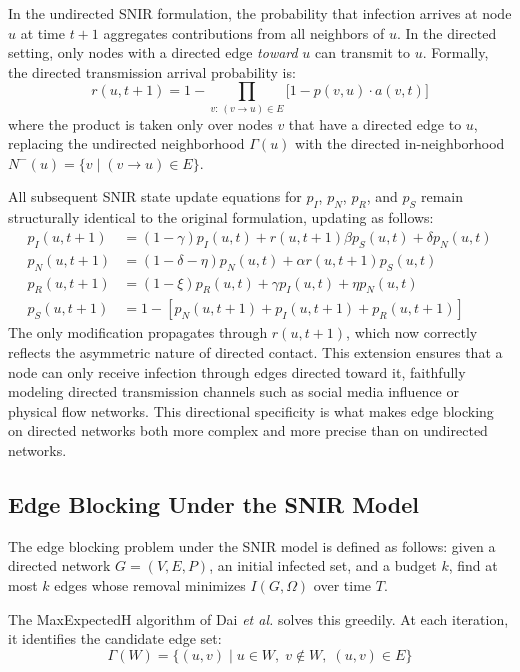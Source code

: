 \documentclass[conference]{IEEEtran}
\begin{document}
In the undirected SNIR formulation, the probability that infection arrives at node $u$ at time $t{+}1$ aggregates contributions from all neighbors of $u$. In the directed setting, only nodes with a directed edge \emph{toward} $u$ can transmit to $u$. Formally, the directed transmission arrival probability is:
\begin{equation}
r(u,t{+}1) = 1 - \prod_{v:\,(v \to u) \in E} \bigl[1 - p(v,u) \cdot a(v,t)\bigr]
\end{equation}
where the product is taken only over nodes $v$ that have a directed edge to $u$, replacing the undirected neighborhood $\Gamma(u)$ with the directed in-neighborhood $N^{-}(u) = \{v \mid (v \to u) \in E\}$.

All subsequent SNIR state update equations for $p_I$, $p_N$, $p_R$, and $p_S$ remain structurally identical to the original formulation, updating as follows:
\begin{align}
p_I(u,t{+}1) &= (1-\gamma) p_I(u,t) + r(u,t{+}1) \beta p_S(u,t) + \delta p_N(u,t) \\
p_N(u,t{+}1) &= (1-\delta-\eta) p_N(u,t) + \alpha r(u,t{+}1) p_S(u,t) \\
p_R(u,t{+}1) &= (1-\xi) p_R(u,t) + \gamma p_I(u,t) + \eta p_N(u,t) \\
p_S(u,t{+}1) &= 1 - [p_N(u,t{+}1) + p_I(u,t{+}1) + p_R(u,t{+}1)]
\end{align}
The only modification propagates through $r(u,t{+}1)$, which now correctly reflects the asymmetric nature of directed contact. This extension ensures that a node can only receive infection through edges directed toward it, faithfully modeling directed transmission channels such as social media influence or physical flow networks. This directional specificity is what makes edge blocking on directed networks both more complex and more precise than on undirected networks.

\subsection{Edge Blocking Under the SNIR Model}

The edge blocking problem under the SNIR model is defined as follows: given a directed network $G = (V, E, P)$, an initial infected set, and a budget $k$, find at most $k$ edges whose removal minimizes $I(G, \Omega)$ over time $T$.

The MaxExpectedH algorithm of Dai \textit{et al.} solves this greedily. At each iteration, it identifies the candidate edge set:
\begin{equation}
\Gamma(W) = \{(u,v) \mid u \in W,\; v \notin W,\; (u,v) \in E \}
\end{equation}
\end{document}
